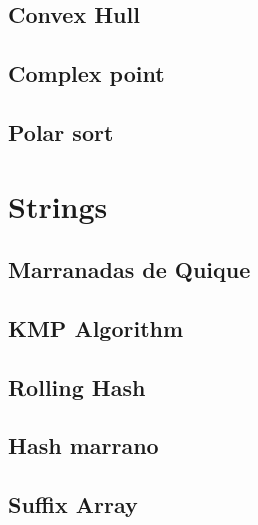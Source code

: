\documentclass[10pt]{article}
\begin{document}
\begin{multicols*}{2}
\subsection{Convex Hull}


\subsection{Complex point}


\subsection{Polar sort}


\section{Strings}

\subsection{Marranadas de Quique}


\subsection{KMP Algorithm}


\subsection{Rolling Hash}


\subsection{Hash marrano}


\subsection{Suffix Array}



\end{multicols*}
\end{document}
